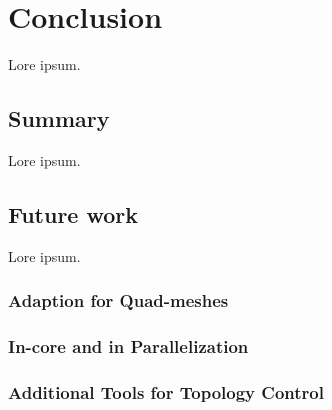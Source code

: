 \chapter{Conclusion}
\label{conclusion0}

Lore ipsum.

\section{Summary}
\label{conclusion1}

Lore ipsum.


\section{Future work}
\label{conclusion2}

Lore ipsum.

\subsection{Adaption for Quad-meshes}
\label{conclusion21}

\subsection{In-core and in Parallelization}
\label{conclusion22}

\subsection{Additional Tools for Topology Control}
\label{conclusion23}
